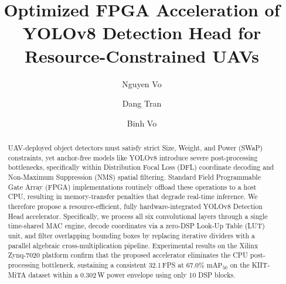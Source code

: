 \documentclass{svproc}
\begin{document}
\raggedbottom
\mainmatter

\title{Optimized FPGA Acceleration of YOLOv8 Detection Head for Resource-Constrained UAVs}


\author{Nguyen Vo \and Dang Tran \and Binh Vo}




\maketitle

\begin{abstract}
UAV-deployed object detectors must satisfy strict Size, Weight, and Power (SWaP) constraints, yet anchor-free models like YOLOv8 introduce severe post-processing bottlenecks, specifically within Distribution Focal Loss (DFL) coordinate decoding and Non-Maximum Suppression (NMS) spatial filtering. Standard Field Programmable Gate Array (FPGA) implementations routinely offload these operations to a host CPU, resulting in memory-transfer penalties that degrade real-time inference. We therefore propose a resource-efficient, fully hardware-integrated YOLOv8 Detection Head accelerator. Specifically, we process all six convolutional layers through a single time-shared MAC engine, decode coordinates via a zero-DSP Look-Up Table (LUT) unit, and filter overlapping bounding boxes by replacing iterative dividers with a parallel algebraic cross-multiplication pipeline. Experimental results on the Xilinx Zynq-7020 platform confirm that the proposed accelerator eliminates the CPU post-processing bottleneck, sustaining a consistent 32.1\,FPS at 67.0\% $\text{mAP}_{50}$ on the KIIT-MiTA dataset within a 0.302\,W power envelope using only 10 DSP blocks.

\end{abstract}
\end{document}
